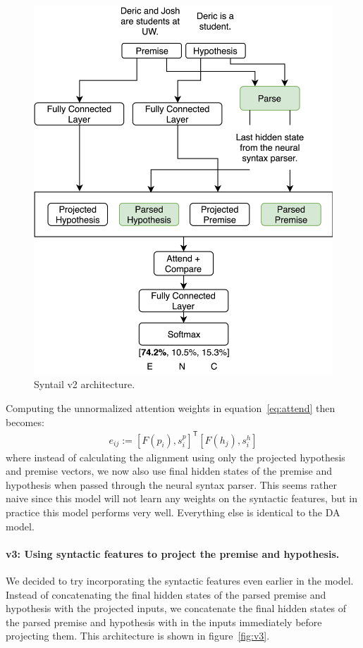 \documentclass[11pt,a4paper]{article}
\begin{document}
\begin{figure}[h]
    \centering
    \includegraphics[width=\linewidth]{figures/v2.png}
    \caption{Syntail v2 architecture.}
\label{fig:v2}
\end{figure}

Computing the
unnormalized attention weights in equation~\ref{eq:attend} then becomes:
\begin{align}
    e_{ij} := [F(p_i), s^p_i]^\mathsf{T} [F(h_j), s^h_i]
\end{align}
where instead of calculating the alignment using only the 
projected hypothesis and premise vectors, we now also use final hidden states of
the premise and hypothesis when passed through the neural syntax parser.
This seems rather naive since this model will not
learn any weights on the syntactic features, but in practice this model
performs very well. Everything else is identical to the DA model.

\paragraph{v3: Using syntactic features to project the premise and hypothesis.}
We decided to try incorporating the syntactic features even earlier in the model.
Instead of concatenating the final hidden states of the parsed premise and hypothesis
with the projected inputs, we concatenate the final hidden states of the parsed
premise and hypothesis with in the inputs immediately before projecting them. This
architecture is shown in figure~\ref{fig:v3}.
\end{document}
